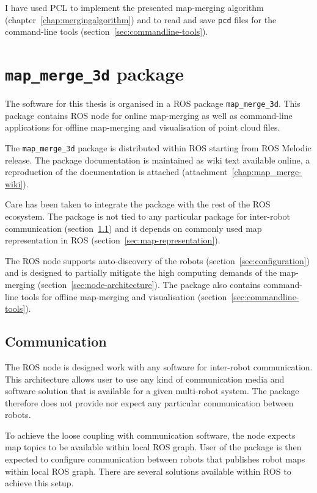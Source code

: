 I have used \gls{PCL} to implement the presented map-merging algorithm (chapter~\ref{chap:mergingalgorithm}) and to read and save \texttt{pcd} files for the command-line tools (section~\ref{sec:commandline-tools}).


\section{\texttt{map\_merge\_3d} package}
\label{sec:ros-package}

The software for this thesis is organised in a \gls{ROS} package \texttt{map\_merge\_3d}. This package contains \gls{ROS} node for online map-merging as well as command-line applications for offline map-merging and visualisation of point cloud files.

The \texttt{map\_merge\_3d} package is distributed within \gls{ROS} starting from \gls{ROS} Melodic release. The package documentation is maintained as wiki text available online, a reproduction of the documentation is attached (attachment~\ref{chap:map_merge-wiki}).

Care has been taken to integrate the package with the rest of the \gls{ROS} ecosystem. The package is not tied to any particular package for inter-robot communication (section~\ref{sec:communication}) and it depends on commonly used map representation in \gls{ROS} (section~\ref{sec:map-representation}).

The \gls{ROS} node supports auto-discovery of the robots (section~\ref{sec:configuration}) and is designed to partially mitigate the high computing demands of the map-merging (section~\ref{sec:node-architecture}). The package also contains command-line tools for offline map-merging and visualisation (section~\ref{sec:commandline-tools}).

\subsection{Communication}
\label{sec:communication}

The \gls{ROS} node is designed work with any software for inter-robot communication. This architecture allows user to use any kind of communication media and software solution that is available for a given multi-robot system. The package therefore does not provide nor expect any particular communication between robots.

To achieve the loose coupling with communication software, the node expects map topics to be available within local \gls{ROS} graph. User of the package is then expected to configure communication between robots that publishes robot maps within local \gls{ROS} graph. There are several solutions available within \gls{ROS} to achieve this setup.

